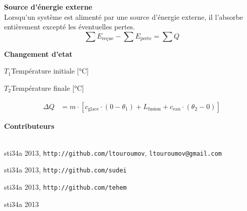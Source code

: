 \documentclass[12pt,a4paper]{article} %
\newcommand\frametitle[1]{ {\bfseries #1} \\[5pt] }
\begin{document}
\frametitle{Source d'énergie externe}
Lorsqu'un système est alimenté par une source d'énergie externe, il l'absorbe entièrement excepté les éventuelles pertes.
\[\sum E_\text{reçue} - \sum E_\text{perte} = \sum Q\]

\frametitle{Changement d'etat}
\begin{vardef}
	\item{$T_1$}{Température initiale [°C]}
	\item{$T_2$}{Température finale [°C]}
\end{vardef}
\begin{align*}
	\Delta Q &= m \cdot [c_\text{glace} \cdot (0-\theta_1) + L_\text{fusion} + c_\text{eau} \cdot (\theta_2 - 0)]
\end{align*}

\newpage

\tableofcontents
\vspace{2em}
\frametitle{\large Contributeurs} \\
\begin{description}[style=nextline]
	\item[Jeremy David] sti34a 2013, \texttt{http://github.com/ltouroumov}, \texttt{ltouroumov@gmail.com}
	\item[Kevin Wenger] sti34a 2013, \texttt{http://github.com/sudei}
	\item[Timothée Moulin] sti34a 2013, \texttt{http://github.com/tehem}
	\item[Vincent Kobel] sti34a 2013
\end{description}

\end{document}
